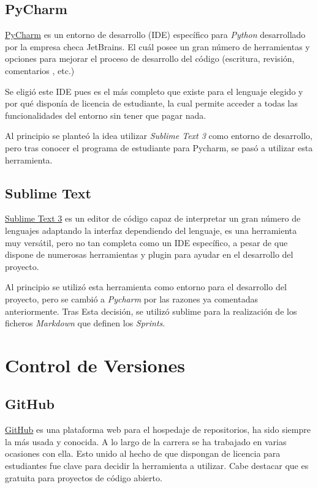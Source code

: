 \subsection{PyCharm}

\href {https://www.jetbrains.com/pycharm/}{PyCharm} es un entorno de desarrollo (IDE) específico para \emph{Python} desarrollado por la empresa checa JetBrains. El cuál posee un gran número de herramientas y opciones para mejorar el proceso de desarrollo del código (escritura, revisión, comentarios , etc.)\cite{pycharm}

Se eligió este IDE pues es el más completo que existe para el lenguaje elegido y por qué disponía de licencia de estudiante, la cual permite acceder a todas las funcionalidades del entorno sin tener que pagar nada.

Al principio se planteó la idea utilizar \emph{Sublime Text 3} como entorno de desarrollo, pero tras conocer el programa de estudiante para Pycharm, se pasó a utilizar esta herramienta.

\subsection{Sublime Text}
\href{https://www.sublimetext.com/}{Sublime Text 3} es un editor de código capaz de interpretar un gran número de lenguajes adaptando la interfaz dependiendo del lenguaje, es una herramienta muy versátil, pero no tan completa como un IDE específico, a pesar de que dispone de numerosas herramientas y plugin para ayudar en el desarrollo del proyecto.\cite{sublime}

Al principio se utilizó esta herramienta como entorno para el desarrollo del proyecto, pero se cambió a \emph{Pycharm} por las razones ya comentadas anteriormente. Tras Esta decisión, se utilizó sublime para la realización de los ficheros \emph{Markdown} que definen los \emph{Sprints}.

\section{Control de Versiones}
\subsection{GitHub}
\href{https://github.com/}{GitHub} es una plataforma web para el hospedaje de repositorios, ha sido siempre la más usada y conocida. A lo largo de la carrera se ha trabajado en varias ocasiones con ella. Esto unido al hecho de que dispongan de licencia para estudiantes fue clave para decidir la herramienta a utilizar. Cabe destacar que es gratuita para proyectos de código abierto.\cite{github}

